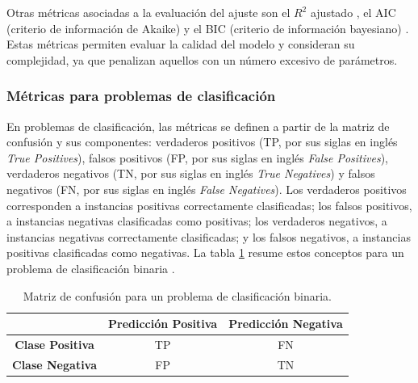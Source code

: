 Otras métricas asociadas a la evaluación del ajuste son el $R^2$ ajustado \cite{kutner2004regression}, el AIC (criterio de información de Akaike) \cite{akaike1974aic} y el BIC (criterio de información bayesiano) \cite{schwarz1978bic}. Estas métricas permiten evaluar la calidad del modelo y consideran su complejidad, ya que penalizan aquellos con un número excesivo de parámetros.

\subsubsection{Métricas para problemas de clasificación}
\label{sec:metricas_clasificacion}
En problemas de clasificación, las métricas se definen a partir de la matriz de confusión y sus componentes: verdaderos positivos (TP, por sus siglas en inglés \textit{True Positives}), falsos positivos (FP, por sus siglas en inglés \textit{False Positives}), verdaderos negativos (TN, por sus siglas en inglés \textit{True Negatives}) y falsos negativos (FN, por sus siglas en inglés \textit{False Negatives}). Los verdaderos positivos corresponden a instancias positivas correctamente clasificadas; los falsos positivos, a instancias negativas clasificadas como positivas; los verdaderos negativos, a instancias negativas correctamente clasificadas; y los falsos negativos, a instancias positivas clasificadas como negativas. La tabla \ref{tab:confusion_matrix} resume estos conceptos para un problema de clasificación binaria \cite{sokolova2009systematic}.

\begin{table}[H]
    \centering
    \caption{Matriz de confusión para un problema de clasificación binaria.}
    \begin{tabular}{c c c}
        \toprule
        & \textbf{Predicción Positiva} & \textbf{Predicción Negativa} \\
        \midrule
        \textbf{Clase Positiva} & TP & FN \\
        \textbf{Clase Negativa} & FP & TN \\
        \bottomrule
    \end{tabular}
    \label{tab:confusion_matrix}
\end{table}

